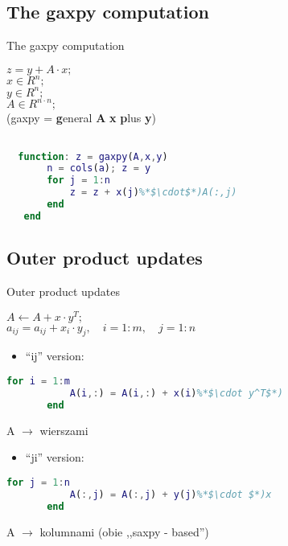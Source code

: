 
\subsection{The gaxpy computation}

\begin{frame}[fragile]{The gaxpy computation}

$z = y + A\cdot x; $ \\

$x \in R^n; $ \\
$y \in R^n; $ \\
$A \in R^{n\cdot n};$ \\
(gaxpy = \textbf{g}eneral \textbf{A} \textbf{x} \textbf{p}lus \textbf{y})

\vspace{10px}
\begin{lstlisting}[language=Matlab]

  function: z = gaxpy(A,x,y)
       n = cols(a); z = y
       for j = 1:n
           z = z + x(j)%*$\cdot$*)A(:,j)
       end
   end
 \end{lstlisting}

\end{frame}


\subsection{Outer product updates}

\begin{frame}[fragile]{Outer product updates}

$A \leftarrow A + x\cdot y^T; $ \\
$a_{ij} = a_{ij} + x_i\cdot y_j, \quad i = 1:m, \quad j = 1:n $ \\

\begin{itemize}
\item ``ij'' version:
\end{itemize}
\begin{lstlisting}[belowskip=-1.4 \baselineskip, language=Matlab]
       for i = 1:m
           A(i,:) = A(i,:) + x(i)%*$\cdot y^T$*)
       end\end{lstlisting}
A $\rightarrow$ wierszami


\begin{itemize}
\item ``ji'' version:
\end{itemize}
\begin{lstlisting}[belowskip=-1.4 \baselineskip, language=Matlab]
       for j = 1:n
           A(:,j) = A(:,j) + y(j)%*$\cdot $*)x
       end\end{lstlisting}
A $\rightarrow$ kolumnami \hfill (obie ,,saxpy - based'')

\end{frame}
